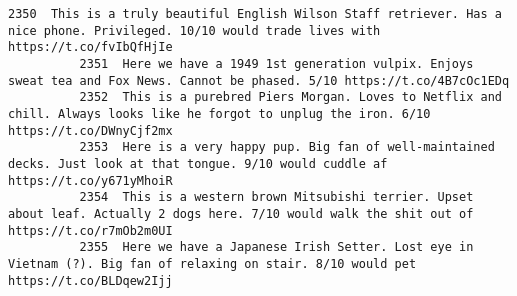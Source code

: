 \documentclass[11pt]{article}
\begin{document}
\begin{Verbatim}[commandchars=\\\{\}]
          2350  This is a truly beautiful English Wilson Staff retriever. Has a nice phone. Privileged. 10/10 would trade lives with https://t.co/fvIbQfHjIe                             
          2351  Here we have a 1949 1st generation vulpix. Enjoys sweat tea and Fox News. Cannot be phased. 5/10 https://t.co/4B7cOc1EDq                                                 
          2352  This is a purebred Piers Morgan. Loves to Netflix and chill. Always looks like he forgot to unplug the iron. 6/10 https://t.co/DWnyCjf2mx                                
          2353  Here is a very happy pup. Big fan of well-maintained decks. Just look at that tongue. 9/10 would cuddle af https://t.co/y671yMhoiR                                       
          2354  This is a western brown Mitsubishi terrier. Upset about leaf. Actually 2 dogs here. 7/10 would walk the shit out of https://t.co/r7mOb2m0UI                              
          2355  Here we have a Japanese Irish Setter. Lost eye in Vietnam (?). Big fan of relaxing on stair. 8/10 would pet https://t.co/BLDqew2Ijj                                      
          

\end{Verbatim}
\end{document}
